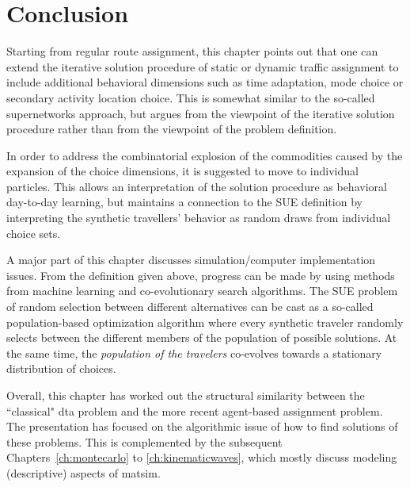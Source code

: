 \section{Conclusion}
\label{sec:agentbased-dta-conclusion}

Starting from
regular route assignment, this chapter points out that one can extend the
iterative solution procedure of static or dynamic traffic assignment
to include additional behavioral dimensions such as time adaptation,
mode choice or secondary activity location choice.  This is somewhat
similar to the so-called supernetworks approach, but argues from the
viewpoint of the iterative solution procedure rather than from the
viewpoint of the problem definition.

In order to address the combinatorial explosion of the commodities
caused by the expansion of the choice dimensions, it is suggested to
move to individual particles.  This allows an interpretation of the
solution procedure as behavioral day-to-day learning, but maintains a
connection to the SUE definition by interpreting the synthetic
travellers' behavior as random draws from individual choice sets.  

A major part of this chapter discusses simulation/computer implementation issues.
From the definition given above, progress can be made by using methods
from machine learning and co-evolutionary search algorithms.  
%
The SUE problem of random selection between different alternatives can
be cast as a so-called population-based optimization algorithm where
every synthetic traveler randomly selects between the different
members of the population of possible solutions.
%
At the same time, the \emph{population of the travelers} co-evolves
towards a stationary distribution of choices.

Overall, this chapter has worked out the structural similarity between the 
``classical" \gls{dta} problem and the more recent agent-based assignment problem.
The presentation has focused on the algorithmic issue of how to find solutions 
of these problems. This is complemented by the subsequent Chapters~\ref{ch:montecarlo} to \ref{ch:kinematicwaves}, 
which mostly discuss modeling (descriptive) aspects of \gls{matsim}.

